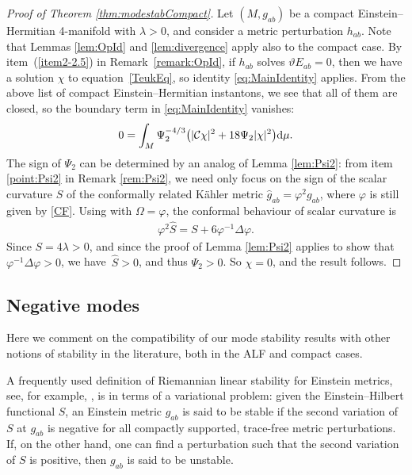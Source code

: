\documentclass[pdftex]{sigma}
\numberwithin{equation}{section}
\begin{document}
\begin{proof}[Proof of Theorem \ref{thm:modestabCompact}]
Let $(M,g_{ab})$ be a compact Einstein--Hermitian 4-manifold with $\lambda>0$, and consider a metric perturbation $h_{ab}$. Note that Lemmas \ref{lem:OpId} and \ref{lem:divergence} apply also to the compact case. By item~(\ref{item2-2.5}) in Remark~\ref{remark:OpId}, if $h_{ab}$ solves $\vartheta E_{ab}=0$, then we have a solution $\chi$ to equation~\eqref{TeukEq}, so identity \eqref{eq:MainIdentity} applies. From the above list of compact Einstein--Hermitian instantons, we see that all of them are closed, so the boundary term in \eqref{eq:MainIdentity} vanishes:
\begin{align*}%
0 = \int_{M}\Psi_{2}^{-4/3}\bigl(|\mathcal{C}\chi|^{2} + 18\Psi_{2}|\chi|^2\bigr){\rm d}\mu.
\end{align*}
The sign of $\Psi_2$ can be determined by an analog of Lemma \ref{lem:Psi2}: from item \eqref{point:Psi2} in Remark \ref{rem:Psi2}, we need only focus on the sign of the scalar curvature $\hat{S}$ of the conformally related K\"ahler metric $\hat{g}_{ab}=\varphi^{2}g_{ab}$, where $\varphi$ is still given by \eqref{CF}. Using \cite[equation~(D.9)]{MR757180} with $\Omega=\varphi$, the conformal behaviour of scalar curvature is
\begin{align*}
 \varphi^2\hat{S} = S + 6\varphi^{-1}\Delta\varphi.
\end{align*}
Since $S=4\lambda>0$, and since the proof of Lemma \ref{lem:Psi2} applies to show that $\varphi^{-1}\Delta\varphi>0$, we have~${\hat{S}>0}$, and thus $\Psi_2>0$. So $\chi=0$, and the result follows.
\end{proof}


\subsection{Negative modes} %
Here we comment on the compatibility of our mode stability results with other notions of stability in the literature, both in the ALF and compact cases.

A frequently used definition of Riemannian linear stability for Einstein metrics, see, for example, \cite[Definition~4.63]{MR2371700}, is in terms of a variational problem: given the Einstein--Hilbert functional $S$, an Einstein metric $g_{ab}$ is said to be stable if the second variation of $S$ at $g_{ab}$ is negative for all compactly supported, trace-free metric perturbations. If, on the other hand, one can find a perturbation such that the second variation of $S$ is positive, then $g_{ab}$ is said to be unstable.
\end{document}
